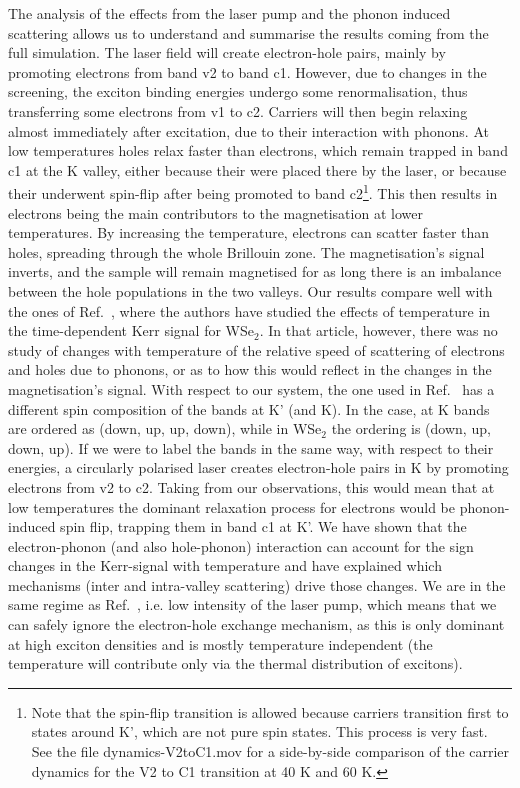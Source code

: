 \documentclass[prb,aps,superscriptaddress,reprint,floatfix]{revtex4-1}
\begin{document}
The analysis of the effects from the laser pump and the phonon induced scattering allows us to understand  and summarise the results coming from the full simulation. The laser field will create electron-hole pairs, mainly by promoting electrons from band v2 to band c1. However, due to changes in the screening, the exciton binding energies undergo some renormalisation, thus transferring some electrons from v1 to c2. Carriers will then begin relaxing almost immediately after excitation, due to their interaction with phonons. At low temperatures holes relax faster than electrons, which remain trapped in band c1 at the K valley, either because their were placed there by the laser, or because their underwent spin-flip after being promoted to band c2\footnote{Note that the spin-flip transition is allowed because carriers transition first to states around K', which are not pure spin states. This process is very fast. See the file dynamics-V2toC1.mov for a side-by-side comparison of the carrier dynamics for the V2 to C1 transition at 40 K and 60 K.}.  This then results in electrons being the main contributors to the magnetisation at lower temperatures.
By increasing the temperature, electrons can scatter faster than holes, spreading through the whole Brillouin zone. The magnetisation's signal inverts, and the sample will remain magnetised for as long there is an imbalance between the hole populations in the two valleys. 
Our results compare well with the ones of Ref.~, where the authors have studied the effects of temperature in the time-dependent Kerr signal for WSe$_2$. In that article, however, there was no study of changes with temperature of the relative speed of scattering of electrons and holes due to phonons, or as to how this would reflect in the changes in the magnetisation's signal.
With respect to our system, the one used in Ref.~ has a different spin composition of the bands at K' (and K). In the \mose case, at K bands are ordered as (down, up, up, down), while in WSe$_2$ the ordering is (down, up, down, up). If we were to label the bands in the same way, with respect to their energies, a circularly polarised laser creates electron-hole pairs in K by promoting electrons from v2 to c2. Taking from our observations, this would mean that at low temperatures the dominant relaxation process for electrons would be phonon-induced spin flip, trapping them in band c1 at K'. 
We have shown that the electron-phonon (and also hole-phonon) interaction can account for the sign changes in the Kerr-signal with temperature and have explained which mechanisms (inter and intra-valley scattering) drive those changes. We are in the same regime as Ref.~, i.e. low intensity of the laser pump, which means that we can safely ignore the electron-hole exchange mechanism, as this is only dominant at high exciton densities and is mostly temperature independent (the temperature will contribute only via the thermal distribution of excitons). 
%

%
\end{document}
